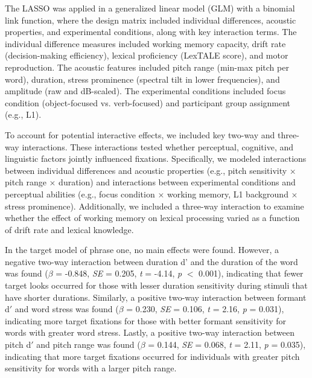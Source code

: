 The LASSO was applied in a generalized linear model (GLM) with a binomial link function, where the design matrix included individual differences, acoustic properties, and experimental conditions, along with key interaction terms. The individual difference measures included working memory capacity, drift rate (decision-making efficiency), lexical proficiency (LexTALE score), and motor reproduction. The acoustic features included pitch range (min-max pitch per word), duration, stress prominence (spectral tilt in lower frequencies), and amplitude (raw and dB-scaled). The experimental conditions included focus condition (object-focused vs. verb-focused) and participant group assignment (e.g., L1).

To account for potential interactive effects, we included key two-way and three-way interactions. These interactions tested whether perceptual, cognitive, and linguistic factors jointly influenced fixations. Specifically, we modeled interactions between individual differences and acoustic properties (e.g., pitch sensitivity × pitch range × duration) and interactions between experimental conditions and perceptual abilities (e.g., focus condition × working memory, L1 background × stress prominence). Additionally, we included a three-way interaction to examine whether the effect of working memory on lexical processing varied as a function of drift rate and lexical knowledge.

In the target model of phrase one, no main effects were found. However, a negative two-way interaction between duration d' and the duration of the word was found ($\beta$ = -0.848, \textit{SE} = 0.205, \textit{t} = -4.14, \textit{p} $<$ 0.001), indicating that fewer target looks occurred for those with lesser duration sensitivity during stimuli that have shorter durations. Similarly, a positive two-way interaction between formant d$'$ and word stress was found ($\beta$ = 0.230, \textit{SE} = 0.106, \textit{t} = 2.16, \textit{p} = 0.031), indicating more target fixations for those with better formant sensitivity for words with greater word stress. Lastly, a positive two-way interaction between pitch d$'$ and pitch range was found ($\beta$ = 0.144, \textit{SE} = 0.068, \textit{t} = 2.11, \textit{p} = 0.035), indicating that more target fixations occurred for individuals with greater pitch sensitivity for words with a larger pitch range.

